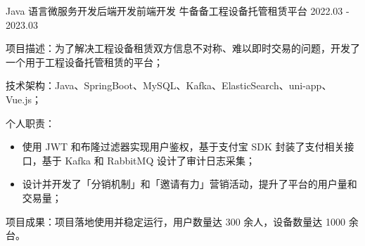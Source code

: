 \begin{cventries}
  \cventry
    {Java 语言微服务开发{\enskip\cdotp\enskip}后端开发{\enskip\cdotp\enskip}前端开发} %
    {牛备备工程设备托管租赁平台} %
    {2022.03 - 2023.03} %
    {} %
    {
      \begin{cvitems}
        \item {项目描述：为了解决工程设备租赁双方信息不对称、难以即时交易的问题，开发了一个用于工程设备托管租赁的平台；}
        \item {技术架构：Java、SpringBoot、MySQL、Kafka、ElasticSearch、uni-app、Vue.js；}
        \item {个人职责：}
          \begin{itemize}
            \item {使用 JWT 和布隆过滤器实现用户鉴权，基于支付宝 SDK 封装了支付相关接口，基于 Kafka 和 RabbitMQ 设计了审计日志采集；}
            \item {设计并开发了「分销机制」和「邀请有力」营销活动，提升了平台的用户量和交易量；}
          \end{itemize}
        \item {项目成果：项目落地使用并稳定运行，用户数量达 300 余人，设备数量达 1000 余台。}
      \end{cvitems}
    }



\end{cventries}
